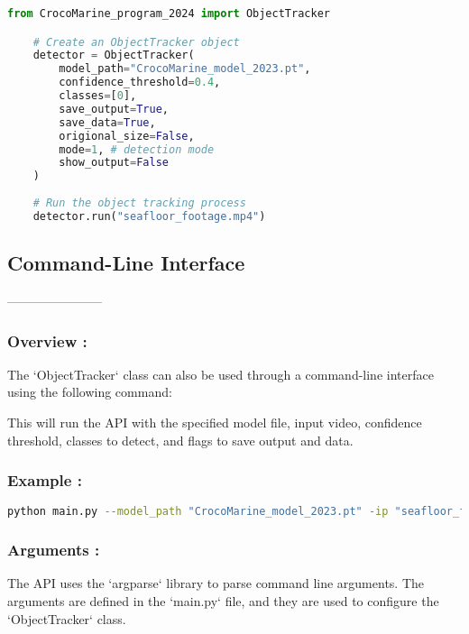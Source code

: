 \documentclass{article}
\begin{document}
\begin{lstlisting}[language=Python]
    from CrocoMarine_program_2024 import ObjectTracker

    # Create an ObjectTracker object
    detector = ObjectTracker(
        model_path="CrocoMarine_model_2023.pt",
        confidence_threshold=0.4,
        classes=[0],
        save_output=True,
        save_data=True,
        origional_size=False,
        mode=1, # detection mode
        show_output=False
    )
    
    # Run the object tracking process
    detector.run("seafloor_footage.mp4")
\end{lstlisting}

\subsection{Command-Line Interface}
-----------------------

\subsubsection{Overview :}

    The `ObjectTracker` class can also be used through a command-line interface using the following command:

    This will run the API with the specified model file, input video, confidence threshold, classes to detect, and flags to save output and data.

\subsubsection{Example :}
\begin{lstlisting}[language=bash, breaklines=true]
    python main.py --model_path "CrocoMarine_model_2023.pt" -ip "seafloor_footage.mp4" --mode 1  --conf 0.4 -show_output --save_output --save_data --origional_size
\end{lstlisting}

\subsubsection{Arguments  :}

The API uses the `argparse` library to parse command line arguments. The arguments are defined in the `main.py` file, and they are used to configure the `ObjectTracker` class.
\end{document}
